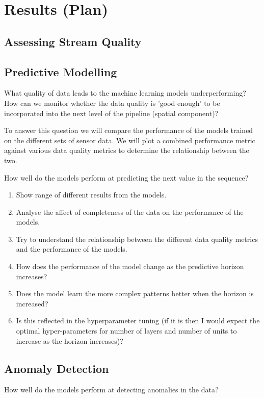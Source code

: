 \section{Results (Plan)}

\subsection{Assessing Stream Quality}


\subsection{Predictive Modelling}
What quality of data leads to the machine learning models underperforming? How can we monitor whether the data quality is 'good enough' to be incorporated into the next level of the pipeline (spatial component)?

To answer this question we will compare the performance of the models trained on the different sets of sensor data. We will plot a combined performance metric against various data quality metrics to determine the relationship between the two.

How well do the models perform at predicting the next value in the sequence?

\begin{enumerate}
    \item Show range of different results from the models.
    \item Analyse the affect of completeness of the data on the performance of the models.
    \item Try to understand the relationship between the different data quality metrics and the performance of the models.
    \item How does the performance of the model change as the predictive horizon increases?
    \item Does the model learn the more complex patterns better when the horizon is increased?
    \item Is this reflected in the hyperparameter tuning (if it is then I would expect the optimal hyper-parameters for number of layers and number of units to increase as the horizon increases)?
\end{enumerate}

\subsection{Anomaly Detection}

How well do the models perform at detecting anomalies in the data?

